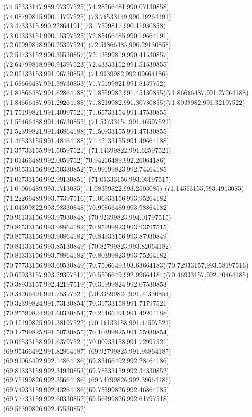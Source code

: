{{	\curveto(74.55333147,989.97397525)(74.28266481,990.07130858)(74.08799815,990.11797525)
	\curveto(73.76533149,990.19264191)(73.4733315,990.22864191)(73.17599817,990.11930858)
	\curveto(73.01333151,990.15397525)(72.85466485,990.19664191)(72.69999818,990.25397524)
	\curveto(72.59866485,990.29130858)(72.51733152,990.35530857)(72.43599819,990.41530857)
	\curveto(72.64799818,990.91397523)(72.43333152,991.51530855)(72.02133153,991.96730853)
	\curveto(71.9039982,992.09664186)(71.68666487,991.98730853)(71.75199821,991.8139752)
	\curveto(71.81866487,991.62864188)(71.8559982,991.45130855)(71.86666487,991.27264188)
	\curveto(71.84666487,991.29264188)(71.8239982,991.30730855)(71.8039982,991.32197522)
	\curveto(71.75199821,991.40997521)(71.65733154,991.47530855)(71.55466488,991.46730855)
	\curveto(71.53733154,991.46597521)(71.52399821,991.46864188)(71.50933155,991.47130855)
	\curveto(71.46533155,991.48464188)(71.42133155,991.49664188)(71.37733155,991.50597521)
	\curveto(71.14399822,991.62597521)(71.03466489,992.0059752)(70.94266489,992.26064186)
	\curveto(70.96533156,992.50330852)(70.99199823,992.74464185)(71.03733156,992.99130851)
	\curveto(71.05333156,993.08197517)(71.07066489,993.1713085)(71.08399822,993.2593085)
	\curveto(71.14533155,993.4913085)(71.22266489,993.77397516)(71.06933156,993.95264182)
	\curveto(71.04399822,993.98330848)(70.99866489,993.98864182)(70.96133156,993.97930848)
	\curveto(70.92399823,994.01797515)(70.86533156,993.98864182)(70.85999823,993.93797515)
	\curveto(70.85733156,993.90864182)(70.84933156,993.87930849)(70.84133156,993.85130849)
	\curveto(70.82799823,993.82064182)(70.81333156,993.78864182)(70.80399823,993.75264182)
	\curveto(70.77733156,993.69530849)(70.7506649,993.63664183)(70.72933157,993.58197516)
	\curveto(70.62933157,993.29397517)(70.5506649,992.99664184)(70.46933157,992.70464185)
	\curveto(70.38933157,992.42197519)(70.31999824,992.07530853)(70.34266491,991.75397521)
	\curveto(70.33599824,991.74330854)(70.32399824,991.73130854)(70.31733158,991.71797521)
	\curveto(70.25599824,991.60330854)(70.21466491,991.49264188)(70.19199825,991.38197522)
	\curveto(70.16133158,991.44597521)(70.12799825,991.50730855)(70.10399825,991.55930854)
	\curveto(70.06533158,991.63797521)(70.00933158,991.72997521)(69.95466492,991.82864187)
	\curveto(69.92799825,991.98864187)(69.91066492,992.14864186)(69.83466492,992.28464186)
	\curveto(69.81333159,992.31930853)(69.78533159,992.34330852)(69.75199826,992.35664186)
	\curveto(69.74799826,992.39664186)(69.74933159,992.43264186)(69.75599826,992.46864185)
	\curveto(69.77733159,992.60330852)(69.56399826,992.61797518)(69.56399826,992.47530852)
}}
